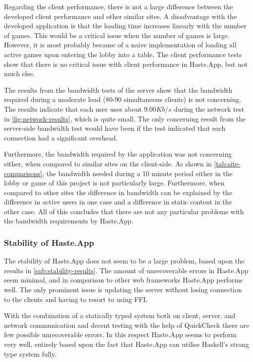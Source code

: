 \documentclass[a4paper]{article}
\begin{document}
Regarding the client performance, there is not a large difference between the developed client performance and other similar sites. A disadvantage with the developed application is that the loading time increases linearly with the number of games. This would be a critical issue when the number of games is large. However, it is most probably because of a naive implementation of loading all active games upon entering the lobby into a table. The client performance tests show that there is no critical issue with client performance in Haste.App, but not much else.

The results from the bandwidth tests of the server show that the bandwidth required during a moderate load (80-90 simultaneous clients) is not concerning. The results indicate that each user uses about $9.00Kb/s$ during the network test in \cref{fig:network-results}, which is quite small. The only concerning result from the server-side bandwidth test would have been if the test indicated that each connection had a significant overhead. 

Furthermore, the bandwidth required by the application was not concerning either, when compared to similar sites on the client-side. As shown in \cref{tab:site-comparisons}, the bandwidth needed during a 10 minute period either in the lobby or game of this project is not particularly large. Furthermore, when compared to other sites the difference in bandwidth can be explained by the difference in active users in one case and a difference in static content in the other case. All of this concludes that there are not any particular problems with the bandwidth requirements by Haste.App.





\subsubsection{Stability of Haste.App}
The stability of Haste.App does not seem to be a large problem, based upon the results in \cref{sub:stability-results}. The amount of unrecoverable errors in Haste.App seem minimal, and in comparison to other web frameworks Haste.App performs well. The only prominent issue is updating the server without losing connection to the clients and having to resort to using FFI.

With the combination of a statically typed system both on client, server, and network communication and decent testing with the help of QuickCheck there are few possible unrecoverable errors. In this respect Haste.App seems to perform very well, entirely based upon the fact that Haste.App can utilise Haskell's strong type system fully.
\end{document}
